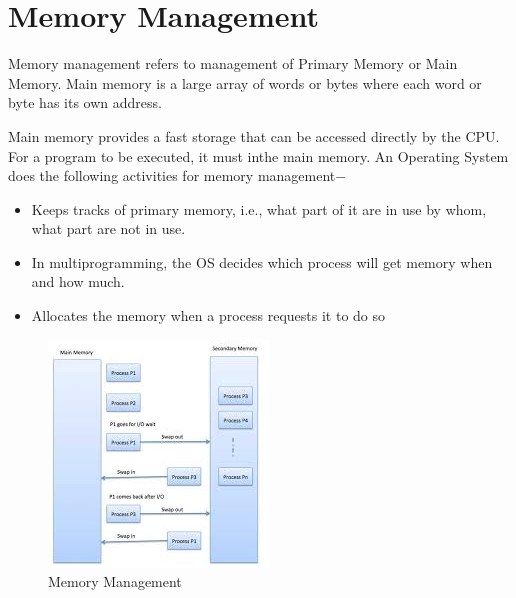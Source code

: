 \documentclass[a4paper,10pt]{article}
\begin{document}
  \tableofcontents
  \thispagestyle{empty}
  \cleardoublepage
  
  \setcounter{page}{1}  
  
  \section{Memory Management}
  Memory management refers to management of Primary Memory or Main Memory. Main memory is a large array of words or bytes where each word or byte has its own address.

Main memory provides a fast storage that can be accessed directly by the CPU. For a program to be executed, it must inthe main memory. An Operating System does the following activities for memory management$-$ 
 \begin{itemize}
  \item Keeps tracks of primary memory, i.e., what part of it are in use by whom, what part are not in use.
  \item In multiprogramming, the OS decides which process will get memory when and how much.
  \item Allocates the memory when a process requests it to do so
 
 \end{itemize}
 \begin{figure}[h]
 \centering
\includegraphics{mg}
\caption{Memory Management}
\end{figure}
\end{document}
